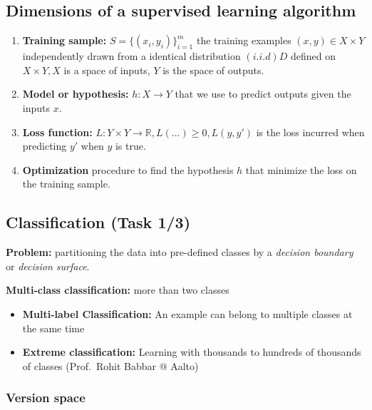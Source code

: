 \documentclass[12pt, a4paper]{article}
\begin{document}
\subsection{Dimensions of a supervised learning algorithm
}\label{dimensions-of-a-supervised-learning-algorithm}

\begin{enumerate}
\def\labelenumi{\arabic{enumi}.}
\item
  \textbf{Training sample:} $S = \{(x_i, y_i)\}^m_{i=1}$ the training
  examples $(x, y) \in X \times Y$ independently drawn from a identical
  distribution $(i.i.d) D$ defined on $X \times Y, X$ is a space of inputs,
  $Y$ is the space of outputs.
\item
  \textbf{Model or hypothesis:} $h : X \rightarrow Y$ that we use to predict
  outputs given the inputs $x$.
\item
  \textbf{Loss function:} $L : Y \times Y \rightarrow \mathbb{R}, L(...) \geq 0, L(y, y')$ is the
  loss incurred when predicting $y'$ when $y$ is true.
\item
  \textbf{Optimization} procedure to find the hypothesis $h$ that
  minimize the loss on the training sample.
\end{enumerate}



\subsection{Classification (Task 1/3)}

\textbf{Problem:} partitioning the data into pre-defined classes by a
\emph{decision boundary} or \emph{decision surface}.

\textbf{Multi-class classification:} more than two classes

\begin{itemize}
  \item \textbf{Multi-label Classification:} An example can belong to multiple classes at the same time
  \item \textbf{Extreme classification:} Learning with thousands to hundreds of thousands of classes (Prof.~Rohit Babbar @ Aalto)
\end{itemize}



\subsubsection{Version space}\label{version-space}
\end{document}
